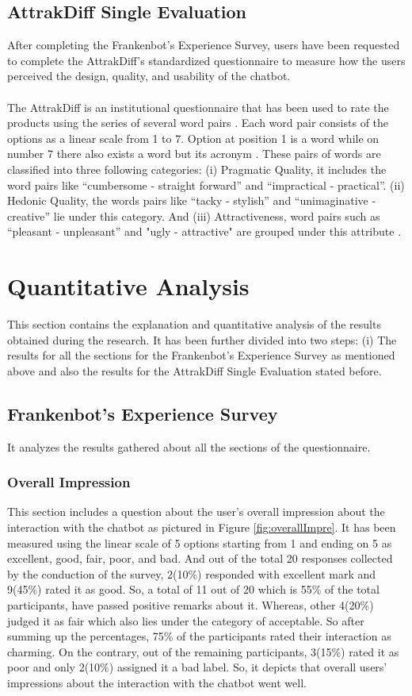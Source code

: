 \subsection{AttrakDiff Single Evaluation}
After completing the Frankenbot's Experience Survey, users have been requested to complete the AttrakDiff's standardized questionnaire to measure how the users perceived the design, quality, and usability of the chatbot.
\\~\\
The AttrakDiff is an institutional questionnaire that has been used to rate the products using the series of several word pairs \cite{alex}. Each word pair consists of the options as a linear scale from 1 to 7. Option at position 1 is a word while on number 7 there also exists a word but its acronym \cite{attrakdiffQuest}. These pairs of words are classified into three following categories: (i) Pragmatic Quality, it includes the word pairs like “cumbersome - straight forward” and “impractical - practical”. (ii) Hedonic Quality, the words pairs like “tacky - stylish” and “unimaginative - creative” lie under this category. And (iii) Attractiveness, word pairs such as “pleasant - unpleasant” and "ugly - attractive" are grouped under this attribute \cite{alex}.

\section{Quantitative Analysis}
This section contains the explanation and quantitative analysis of the results obtained during the research. It has been further divided into two steps: (i) The results for all the sections for the Frankenbot's Experience Survey as mentioned above and also the results for the AttrakDiff Single Evaluation stated before. 

\subsection{Frankenbot's Experience Survey}
It analyzes the results gathered about all the sections of the questionnaire.

\subsubsection*{Overall Impression}
This section includes a question about the user's overall impression about the interaction with the chatbot as pictured in Figure \ref{fig:overallImpre}. It has been measured using the linear scale of 5 options starting from 1 and ending on 5 as excellent, good, fair, poor, and bad. And out of the total 20 responses collected by the conduction of the survey, 2(10\%) responded with excellent mark and 9(45\%) rated it as good. So, a total of 11 out of 20 which is 55\% of the total participants, have passed positive remarks about it. Whereas, other 4(20\%) judged it as fair which also lies under the category of acceptable. So after summing up the percentages, 75\% of the participants rated their interaction as charming. On the contrary, out of the remaining participants, 3(15\%) rated it as poor and only 2(10\%) assigned it a bad label. So, it depicts that overall users' impressions about the interaction with the chatbot went well.

